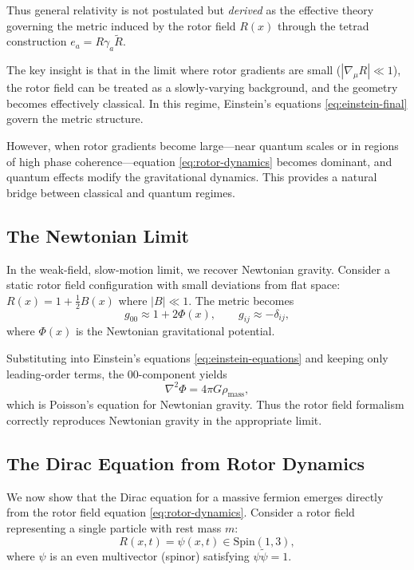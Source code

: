 \documentclass[11pt,a4paper]{article}
\numberwithin{equation}{section}
\theoremstyle{plain}
\theoremstyle{definition}
\theoremstyle{remark}
\begin{document}
Thus general relativity is not postulated but \emph{derived} as the effective theory governing the metric induced by the rotor field $R(x)$ through the tetrad construction $e_a = R\gamma_a\widetilde{R}$.

The key insight is that in the limit where rotor gradients are small ($|\nabla_\mu R| \ll 1$), the rotor field can be treated as a slowly-varying background, and the geometry becomes effectively classical. In this regime, Einstein's equations \eqref{eq:einstein-final} govern the metric structure.

However, when rotor gradients become large---near quantum scales or in regions of high phase coherence---equation \eqref{eq:rotor-dynamics} becomes dominant, and quantum effects modify the gravitational dynamics. This provides a natural bridge between classical and quantum regimes.

\subsection{The Newtonian Limit}

In the weak-field, slow-motion limit, we recover Newtonian gravity. Consider a static rotor field configuration with small deviations from flat space: $R(x) = 1 + \frac{1}{2}B(x)$ where $|B| \ll 1$. The metric becomes
\begin{equation}
g_{00} \approx 1 + 2\Phi(x), \qquad g_{ij} \approx -\delta_{ij},
\end{equation}
where $\Phi(x)$ is the Newtonian gravitational potential.

Substituting into Einstein's equations \eqref{eq:einstein-equations} and keeping only leading-order terms, the $00$-component yields
\begin{equation}
\nabla^2 \Phi = 4\pi G \rho_{\mathrm{mass}},
\label{eq:poisson}
\end{equation}
which is Poisson's equation for Newtonian gravity. Thus the rotor field formalism correctly reproduces Newtonian gravity in the appropriate limit.

\subsection{The Dirac Equation from Rotor Dynamics}

We now show that the Dirac equation for a massive fermion emerges directly from the rotor field equation \eqref{eq:rotor-dynamics}. Consider a rotor field representing a single particle with rest mass $m$:
\begin{equation}
R(x,t) = \psi(x,t) \in \mathrm{Spin}(1,3),
\end{equation}
where $\psi$ is an even multivector (spinor) satisfying $\psi\widetilde{\psi} = 1$.
\end{document}
